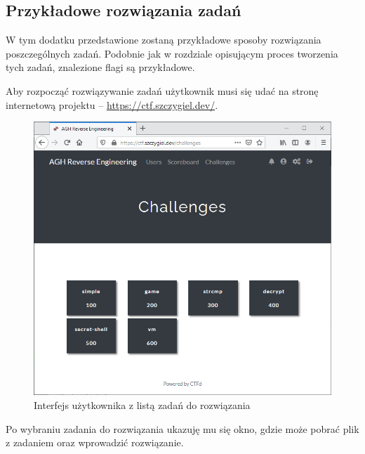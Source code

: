 \documentclass[language=polish,type=eng]{aghmodern}
\begin{document}
\begin{appendices}
\chapter{Przykładowe rozwiązania zadań}
\label{chap:writeups}

W tym dodatku przedstawione zostaną przykładowe sposoby rozwiązania poszczególnych zadań.
Podobnie jak w rozdziale opisującym proces tworzenia tych zadań, znalezione
flagi są przykładowe.

Aby rozpocząć rozwiązywanie zadań użytkownik musi się udać na stronę internetową
projektu -- \url{https://ctf.szczygiel.dev/}.

\begin{figure}[H]
\centering
\includegraphics[width=\textwidth]{ui_challenges}
\caption{Interfejs użytkownika z listą zadań do rozwiązania}
\end{figure}

Po wybraniu zadania do rozwiązania ukazuję mu się okno,
gdzie może pobrać plik z zadaniem oraz wprowadzić rozwiązanie.


\end{appendices}
\end{document}
